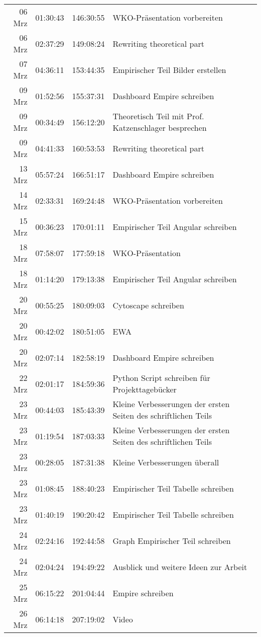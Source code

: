 \begin{longtable}{r | r | r | p{}}
	 06 Mrz & 01:30:43 & 146:30:55 & WKO-Präsentation vorbereiten \\ 
	 06 Mrz & 02:37:29 & 149:08:24 & Rewriting theoretical part \\ 
	 07 Mrz & 04:36:11 & 153:44:35 & Empirischer Teil Bilder erstellen \\ 
	 09 Mrz & 01:52:56 & 155:37:31 & Dashboard Empire schreiben \\ 
	 09 Mrz & 00:34:49 & 156:12:20 & Theoretisch Teil mit Prof. Katzenschlager besprechen \\ 
	 09 Mrz & 04:41:33 & 160:53:53 & Rewriting theoretical part \\ 
	 13 Mrz & 05:57:24 & 166:51:17 & Dashboard Empire schreiben \\ 
	 14 Mrz & 02:33:31 & 169:24:48 & WKO-Präsentation vorbereiten \\ 
	 15 Mrz & 00:36:23 & 170:01:11 & Empirischer Teil Angular schreiben \\ 
	 18 Mrz & 07:58:07 & 177:59:18 & WKO-Präsentation \\ 
	 18 Mrz & 01:14:20 & 179:13:38 & Empirischer Teil Angular schreiben \\ 
	 20 Mrz & 00:55:25 & 180:09:03 & Cytoscape schreiben \\ 
	 20 Mrz & 00:42:02 & 180:51:05 & EWA \\ 
	 20 Mrz & 02:07:14 & 182:58:19 & Dashboard Empire schreiben \\ 
	 22 Mrz & 02:01:17 & 184:59:36 & Python Script schreiben für Projekttagebücker \\ 
	 23 Mrz & 00:44:03 & 185:43:39 & Kleine Verbesserungen der ersten Seiten des schriftlichen Teils \\ 
	 23 Mrz & 01:19:54 & 187:03:33 & Kleine Verbesserungen der ersten Seiten des schriftlichen Teils \\ 
	 23 Mrz & 00:28:05 & 187:31:38 & Kleine Verbesserungen überall \\ 
	 23 Mrz & 01:08:45 & 188:40:23 & Empirischer Teil Tabelle schreiben \\ 
	 23 Mrz & 01:40:19 & 190:20:42 & Empirischer Teil Tabelle schreiben \\ 
	 24 Mrz & 02:24:16 & 192:44:58 & Graph Empirischer Teil schreiben \\ 
	 24 Mrz & 02:04:24 & 194:49:22 & Ausblick und weitere Ideen zur Arbeit \\ 
	 25 Mrz & 06:15:22 & 201:04:44 & Empire schreiben \\ 
	 26 Mrz & 06:14:18 & 207:19:02 & Video \\ 

\end{longtable}
